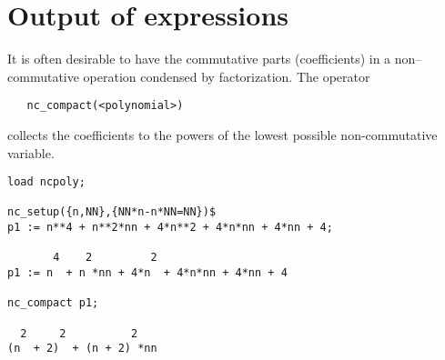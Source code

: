 \section{Output of expressions}

It is often desirable to have the commutative parts (coefficients)
in a non--commutative operation condensed by factorization. The operator
\begin{verbatim}
   nc_compact(<polynomial>)
\end{verbatim}
collects the coefficients to the powers of the lowest possible
non-commutative variable.
\begin{verbatim}
load ncpoly;

nc_setup({n,NN},{NN*n-n*NN=NN})$
p1 := n**4 + n**2*nn + 4*n**2 + 4*n*nn + 4*nn + 4;

       4    2         2
p1 := n  + n *nn + 4*n  + 4*n*nn + 4*nn + 4

nc_compact p1;

  2     2          2
(n  + 2)  + (n + 2) *nn
\end{verbatim}


